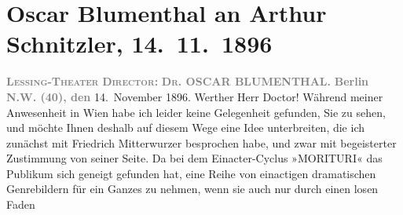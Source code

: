 

               \section[Oscar Blumenthal an Arthur Schnitzler, 14. 11. 1896]{ Oscar Blumenthal an Arthur Schnitzler, 14. 11. 1896}\nopagebreak{}\rehead{ }\begin{ledgroupsized}[t]{13cm}\normalsize\beginnumbering{} \toendnotes[C]{\smallbreak\pagebreak[2]} 
\pstart
           \noindent{}\centering{}{\pb}\textcolor{gray}{\textbf{\textsc{Lessing-Theater}}}\pend
           \pstart
           \noindent{}\centering{}\textcolor{gray}{\textbf{\textsc{Director}:}}{ }\textcolor{gray}{\textbf{\textsc{Dr.}{ }OSCAR BLUMENTHAL.}}\pend
           \pstart
           \raggedleft{}\textcolor{gray}{\textbf{Berlin N.W. (40), den}}{ }14. November 1896.\pend
           \pstart\center{}Werther Herr Doctor!\pend\pstart
           Während meiner Anwesenheit in Wien habe ich
                    leider keine Gelegenheit gefunden, Sie zu sehen, und möchte Ihnen deshalb auf
                    diesem Wege eine Idee unterbreiten, die ich zunächst mit Friedrich Mitterwurzer besprochen habe, und zwar mit
                    begeisterter Zustimmung von seiner Seite. Da bei dem Einacter-Cyclus »MORITURI« das
                    Publikum sich geneigt gefunden hat, eine Reihe von einactigen dramatischen
                    Genrebildern für ein Ganzes zu nehmen, wenn sie auch nur durch einen losen Faden

\end{ledgroupsized}
